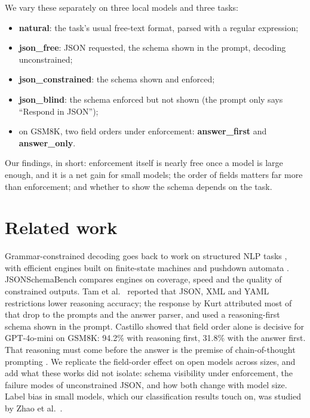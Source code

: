 \documentclass[10pt,twocolumn]{article}
\begin{document}
We vary these separately on three local models and three tasks:

\begin{itemize}
\item \textbf{natural}: the task's usual free-text format, parsed with a regular expression;
\item \textbf{json\_free}: JSON requested, the schema shown in the prompt, decoding unconstrained;
\item \textbf{json\_constrained}: the schema shown and enforced;
\item \textbf{json\_blind}: the schema enforced but not shown (the prompt only says ``Respond in JSON'');
\item on GSM8K, two field orders under enforcement: \textbf{answer\_first} and \textbf{answer\_only}.
\end{itemize}

Our findings, in short: enforcement itself is nearly free once a model is large enough, and it is a net gain for
small models; the order of fields matters far more than enforcement; and whether to show the schema depends on the
task.

\section{Related work}

Grammar-constrained decoding goes back to work on structured NLP tasks \cite{gcd}, with efficient engines built on
finite-state machines \cite{outlines} and pushdown automata \cite{xgrammar}. JSONSchemaBench \cite{jsonschemabench}
compares engines on coverage, speed and the quality of constrained outputs. Tam et al.\ \cite{speakfreely} reported
that JSON, XML and YAML restrictions lower reasoning accuracy; the response by Kurt \cite{saywhat} attributed most of
that drop to the prompts and the answer parser, and used a reasoning-first schema shown in the prompt. Castillo
\cite{castillo} showed that field order alone is decisive for GPT-4o-mini on GSM8K: 94.2\% with reasoning first,
31.8\% with the answer first. That reasoning must come before the answer is the premise of chain-of-thought
prompting \cite{cot}. We replicate the field-order effect on open models across sizes, and add what these works did
not isolate: schema visibility under enforcement, the failure modes of unconstrained JSON, and how both change with
model size. Label bias in small models, which our classification results touch on, was studied by
Zhao et al.\ \cite{zhao}.
\end{document}
